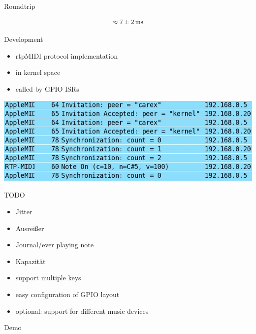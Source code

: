 \begin{frame}{Roundtrip}
	
	\[\approx 7\pm2\text{\,ms}\]
	
\end{frame}

\begin{frame}{Development}
	\begin{itemize}
		\item rtpMIDI protocol implementation 
		\item in kernel space
		\pause
		\item called by GPIO ISRs
	\end{itemize}
	\includegraphics[width=\textwidth]{img/kernelmidi.jpg}
\end{frame}

\begin{frame}{TODO}
	\begin{itemize}
		\item Jitter
		\item Ausreißer
		\item Journal/ever playing note
		\item Kapazität
		\item support multiple keys
		\item easy configuration of GPIO layout
		\item optional: support for different music devices
	\end{itemize}
\end{frame}

\begin{frame}
	\centering
	\Huge Demo
\end{frame}
